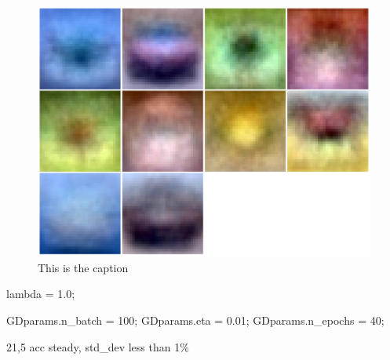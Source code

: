 \documentclass[]{article}
\begin{document}
\begin{figure}[h]
\centering
\includegraphics{../Result_Pics/b100e40eta01la1_proto.pdf}
\caption{This is the caption}
\end{figure}

lambda = 1.0;

GDparams.n\_batch = 100; GDparams.eta = 0.01; GDparams.n\_epochs = 40;

21,5 acc steady, std\_dev less than 1\%
\end{document}

